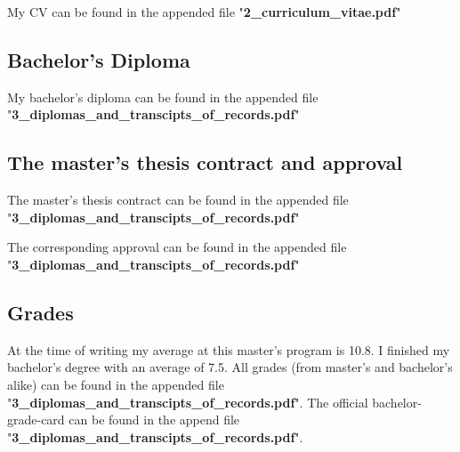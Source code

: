 \documentclass[a4paper]{article}
\begin{document}
My CV can be found in the appended file "\textbf{2\_curriculum\_vitae.pdf}"

\subsection{Bachelor's Diploma}

My bachelor's diploma can be found in the appended file "\textbf{3\_diplomas\_and\_transcipts\_of\_records.pdf}"

\subsection{The master's thesis contract and approval}

The master's thesis contract can be found in the appended file "\textbf{3\_diplomas\_and\_transcipts\_of\_records.pdf}"\par

The corresponding approval can be found in the appended file "\textbf{3\_diplomas\_and\_transcipts\_of\_records.pdf}"

\subsection{Grades}

At the time of writing my average at this master's program is 10.8. I finished my bachelor's degree with an average of 7.5. All grades (from master's and bachelor's alike) can be found in the appended file "\textbf{3\_diplomas\_and\_transcipts\_of\_records.pdf}". The official bachelor-grade-card can be found in the append file "\textbf{3\_diplomas\_and\_transcipts\_of\_records.pdf}".\par
\end{document}
